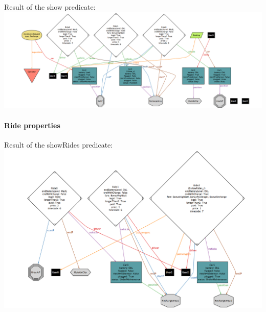 \documentclass[]{article}
\let\oldparagraph\paragraph
\renewcommand{\paragraph}[1]{\oldparagraph{#1}\mbox{}}
\begin{document}
Result of the show predicate: \newline
\includegraphics[width=1.00000\textwidth,height=1.00000\textwidth]{./alloyworlds/show.png}

\paragraph{Ride properties}\label{ride-properties}

Result of the showRides predicate: \newline
\includegraphics[width=1.00000\textwidth,height=1.00000\textwidth]{./alloyworlds/showRides.png}
\end{document}
